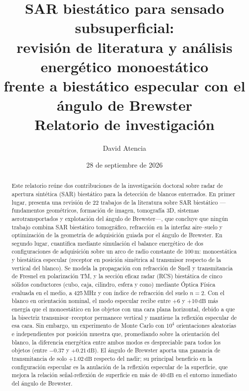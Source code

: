 \documentclass[11pt,a4paper]{report}
\title{\bfseries SAR biestático para sensado subsuperficial:\\[4pt]
revisión de literatura y análisis energético monoestático\\
frente a biestático especular con el ángulo de Brewster\\[10pt]
\large Relatorio de investigación}
\author{David Atencia}
\date{28 de septiembre de 2026}
\newcommand{\dB}{\,\mathrm{dB}}
\begin{document}
\maketitle

\begin{abstract}
\noindent
Este relatorio reúne dos contribuciones de la investigación doctoral sobre
radar de apertura sintética (SAR) biestático para la detección de blancos
enterrados. En primer lugar, presenta una revisión de 22 trabajos de la
literatura sobre SAR biestático ---fundamentos geométricos, formación de
imagen, tomografía 3D, sistemas aerotransportados y explotación del ángulo
de Brewster---, que concluye que ningún trabajo combina SAR biestático
tomográfico, refracción en la interfaz aire--suelo y optimización de la
geometría de adquisición guiada por el ángulo de Brewster. En segundo lugar,
cuantifica mediante simulación el balance energético de dos configuraciones
de adquisición sobre un arco de radio constante de 100\,m: monoestática y
biestática especular (receptor en posición simétrica al transmisor respecto
de la vertical del blanco). Se modela la propagación con refracción de Snell
y transmitancia de Fresnel en polarización TM, y la sección eficaz radar
(RCS) biestática de cinco sólidos conductores (cubo, caja, cilindro, esfera y
cono) mediante Óptica Física evaluada en el medio, a 425\,MHz y con índice
de refracción del suelo $n=2$. Con el blanco en orientación nominal, el modo
especular recibe entre $+6$ y $+10\dB$ más energía que el monoestático en los
objetos con una cara plana horizontal, debido a que la bisectriz
transmisor--receptor permanece vertical y mantiene la reflexión especular de
esa cara. Sin embargo, un experimento de Monte Carlo con $10^4$ orientaciones
aleatorias e independientes por posición muestra que, promediando sobre la
orientación del blanco, la diferencia energética entre ambos modos es
despreciable para todos los objetos (entre $-0.37$ y $+0.21\dB$). El
ángulo de Brewster aporta una ganancia de transmitancia de solo $+1.02\dB$
respecto del nadir; su principal beneficio en la configuración especular es
la anulación de la reflexión especular de la superficie, que mejora la
relación señal-reflexión de superficie en más de $40\dB$ en el entorno
inmediato del ángulo de Brewster.
\end{abstract}

\tableofcontents

\end{document}
